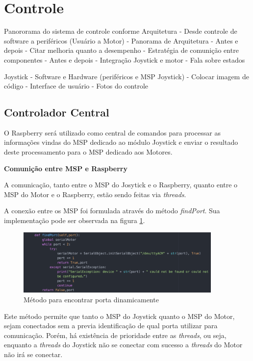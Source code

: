 \section{Controle}

Panororama do sistema de controle conforme Arquitetura
  - Desde controle de software a periféricos (Usuário a Motor)
  - Panorama de Arquitetura - Antes e depois
    - Citar melhoria quanto a desempenho
  - Estratégia de comunição entre componentes - Antes e depois
  - Integração Joystick e motor - Fala sobre estados

Joystick
  - Software e Hardware (periféricos e MSP Joystick)
    - Colocar imagem de código
  - Interface de usuário
    - Fotos do controle


\subsection{Controlador Central}

  O Raspberry será utilizado como central de comandos para processar as informações vindas do MSP dedicado ao módulo Joystick e enviar o resultado deste processamento para o MSP dedicado aos Motores.

  \textbf{Comunição entre MSP e Raspberry}

  A comunicação, tanto entre o MSP do Josytick e o Raspberry, quanto entre o MSP do Motor e o Raspberry, estão sendo feitas via \textit{threads}.

  A conexão entre os MSP foi formulada através do método \textit{findPort}. Sua implementação pode ser observada na figura \ref{fig:find_port_method}.

  \begin{figure}[!htb]
  \centering
  \includegraphics[width=0.9\textwidth]{figuras/resultados/find_port_method}
  \caption{Método para encontrar porta dinamicamente}
  \label{fig:find_port_method}
  \end{figure}

  Este método permite que tanto o MSP do Joystick quanto o MSP do Motor, sejam conectados sem a previa identificação de qual porta utilizar para comunicação. Porém, há existência de prioridade entre as \textit{threads}, ou seja, enquanto a \textit{threads} do Joystick não se conectar com sucesso a \textit{threads} do Motor não irá se conectar.

